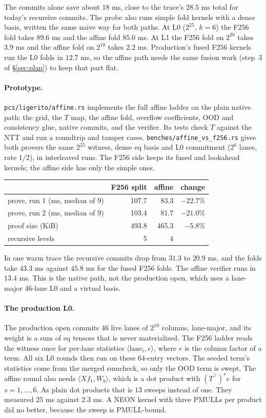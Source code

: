 \documentclass[11pt]{article}
\begin{document}
The commits alone save about $18$ ms, close to the trace's
$28.5$ ms total for today's recursive commits. The probe also runs
simple fold kernels with a dense basis, written the same naive way for
both paths. At L0 ($2^{25}$, $k = 6$) the F256 fold takes $89.6$ ms and
the affine fold $85.0$ ms. At L1 the F256 fold on $2^{20}$ takes
$3.9$ ms and the affine fold on $2^{19}$ takes $2.2$ ms. Production's
fused F256 kernels run the L0 folds in $12.7$ ms, so the affine path
needs the same fusion work (step~3 of \S\ref{sec:plan}) to keep that
part flat.

\paragraph{Prototype.} \texttt{pcs/ligerito/affine.rs} implements the
full affine ladder on the plain native path: the grid, the $T$ map,
the affine fold, overflow coefficients, OOD and consistency glue,
native commits, and the verifier. Its tests check $T$ against the NTT
and run a roundtrip and tamper cases. \texttt{benches/affine\_vs\_f256.rs}
gives both provers the same $2^{25}$ witness, dense eq basis and L0
commitment ($2^6$ lanes, rate $1/2$), in interleaved runs. The F256
side keeps its fused and lookahead kernels; the affine side has only
the simple ones.
\begin{center}
\begin{tabular}{lrrr}
\toprule
& F256 split & affine & change \\
\midrule
prove, run 1 (ms, median of 9) & 107.7 & 83.3 & $-22.7\%$ \\
prove, run 2 (ms, median of 9) & 103.4 & 81.7 & $-21.0\%$ \\
proof size (KiB) & 493.8 & 465.3 & $-5.8\%$ \\
recursive levels & 5 & 4 & \\
\bottomrule
\end{tabular}
\end{center}
In one warm trace the recursive commits drop from $31.3$ to $20.9$ ms,
and the folds take $43.3$ ms against $45.8$ ms for the fused F256
folds. The affine verifier runs in $13.4$ ms. This is the native path,
not the production open, which uses a lane-major 46-lane L0 and a
virtual basis.

\paragraph{The production L0.} The production open commits $46$ live
lanes of $2^{19}$ columns, lane-major, and its weight is a sum of eq
tensors that is never materialized. The F256 ladder reads the witness
once for per-lane statistics $\langle \mathrm{lane}_i, e\rangle$, where
$e$ is the column factor of a term. All six L0 rounds then run on
these $64$-entry vectors. The seeded term's statistics come from the
merged sumcheck, so only the OOD term is swept. The affine round also
needs $\langle X f_1, W_b\rangle$, which is a dot product with
$(T^{\top})^s e$ for $s = 1, \dots, 6$. As plain dot products that is
$13$ sweeps instead of one. They measured $25$ ms against $2.3$ ms. A
NEON kernel with three PMULLs per product did no better, because
the sweep is PMULL-bound.
\end{document}
